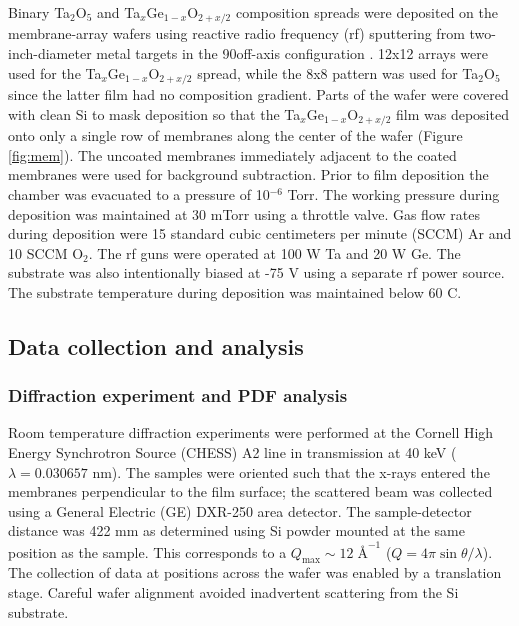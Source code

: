 Binary Ta$_{2}$O$_{5}$ and Ta$_{x}$Ge$_{1-x}$O$_{2+x/2}$ composition spreads were deposited on the membrane-array wafers using reactive radio frequency (rf) sputtering from two-inch-diameter metal targets in the 90\textdegree off-axis configuration \cite{VanDover1998}. 
12x12 arrays were used for the Ta$_{x}$Ge$_{1-x}$O$_{2+x/2}$ spread, while the 8x8 pattern was used for Ta$_{2}$O$_{5}$ since the latter film had no composition gradient. 
Parts of the wafer were covered with clean Si to mask deposition so that the Ta$_{x}$Ge$_{1-x}$O$_{2+x/2}$ film was deposited onto only a single row of membranes along the center of the wafer (Figure \ref{fig:mem}). The uncoated membranes immediately adjacent to the coated membranes were used for background subtraction. Prior to film deposition the chamber was evacuated to a pressure of 10$^{-6}$ Torr. The working pressure during deposition was maintained at 30 mTorr using a throttle valve. 
Gas flow rates during deposition were 15 standard cubic centimeters per minute (SCCM) Ar and 10 SCCM O$_{2}$. The rf guns were operated at 100 W Ta and 20 W Ge. The substrate was also intentionally biased at -75 V using a separate rf power source. The substrate temperature during deposition was maintained below 60 \textdegree C.

\subsection{Data collection and analysis} 
\subsubsection{Diffraction experiment and PDF analysis} 

Room temperature diffraction experiments were performed at the Cornell High Energy Synchrotron Source (CHESS) A2 line in transmission at 40 keV ($\lambda=0.030657$ nm). The samples were oriented such that the x-rays entered the membranes perpendicular to the film surface; the scattered beam was collected using a General Electric (GE) DXR-250 area detector. The sample-detector distance was 422 mm as determined using Si powder mounted at the same position as the sample. This corresponds to a $Q_{\text{max}}\sim 12\;\text{\AA}^{-1}$ ($Q = 4\pi \sin{\theta}/\lambda$). The collection of data at positions across the wafer was enabled by a translation stage. Careful wafer alignment avoided inadvertent scattering from the Si substrate. 

